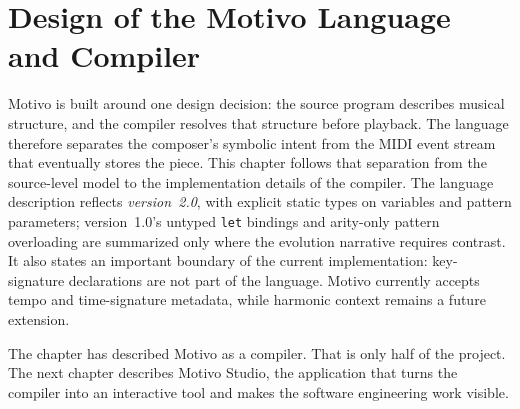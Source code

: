 \chapter{Design of the Motivo Language and Compiler}\label{ch:language-compiler}

Motivo is built around one design decision: the source program describes musical structure, and the compiler
resolves that structure before playback. The language therefore separates the composer's symbolic intent from
the MIDI event stream that eventually stores the piece. This chapter follows that separation from the
source-level model to the implementation details of the compiler.
The language description reflects \textit{version~2.0}, with explicit static types on variables and pattern parameters;
version~1.0's untyped \texttt{let} bindings and arity-only pattern overloading are summarized only where the evolution
narrative requires contrast.
It also states an important boundary of the current implementation: key-signature declarations are not part of the
language. Motivo currently accepts tempo and time-signature metadata, while harmonic context remains a future extension.













The chapter has described Motivo as a compiler. That is only half of the project. The next chapter describes
Motivo Studio, the application that turns the compiler into an interactive tool and makes the software
engineering work visible.
